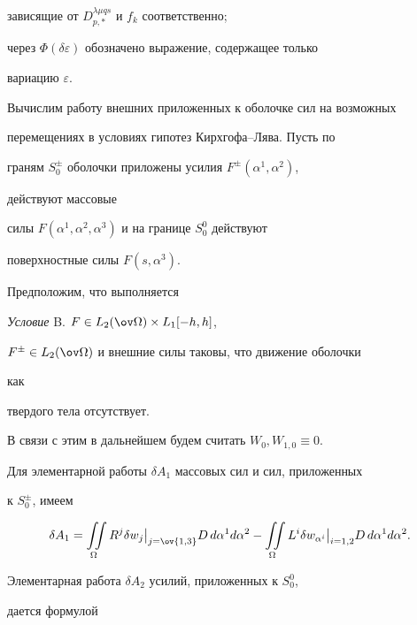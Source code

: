 зависящие от $D^{\lambda\mu{}qs}_{p,*}$ и $f_k$ соответственно; 


через $\Phi(\delta\varepsilon)$ обозначено выражение, содержащее только 


вариацию $\varepsilon$. 


 


Вычислим работу внешних приложенных к оболочке сил на возможных  


перемещениях в условиях гипотез Кирхгофа--Лява. Пусть по 


граням $S^\pm_0$ оболочки приложены усилия $F^\pm(\alpha^1,\alpha^2)$, 


действуют массовые 


силы $F(\alpha^1,\alpha^2,\alpha^3)$ и на границе $S^0_0$ действуют 


поверхностные силы $F(s,\alpha^3)$. 


Предположим, что выполняется 


\medskip 


 


{\it Условие} B. $F\in L_2(\ov\Omega)\times L_1[-h,h]$, 


$F^\pm\in{}L_2(\ov\Omega)$ и внешние силы таковы, что движение оболочки 


как 


твердого тела отсутствует. 


\medskip 


 


В связи с этим в дальнейшем будем считать $W_0,W_{1,0}\equiv 0$. 


 


Для элементарной работы $\delta A_1$ массовых сил и сил, приложенных 


к $S^\pm_0$, имеем 


$$ 


\delta A_1=\iint\limits_\Omega R^j\delta w_j\big|_{j=\ov{1,3}} 


D\,d\alpha^1d\alpha^2-\iint\limits_\Omega L^i\delta 


w_{\alpha^i}\big|_{i=1,2}D\,d\alpha^1d\alpha^2. 


$$ 


 


Элементарная работа $\delta A_2$ усилий, приложенных к $S^0_0$, 


дается формулой 



